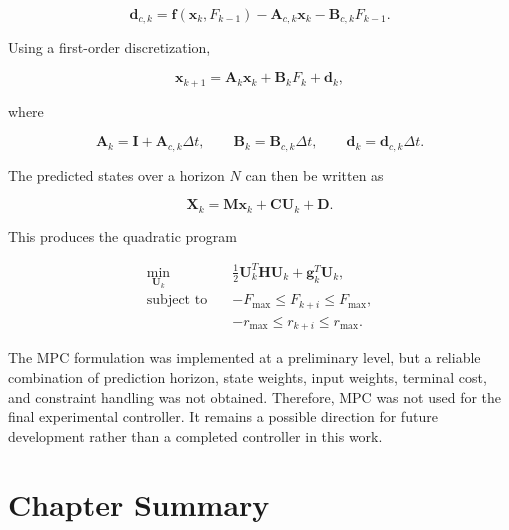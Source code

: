 \begin{equation}
\mathbf{d}_{c,k}
=
\mathbf{f}(\mathbf{x}_k,F_{k-1})
-
\mathbf{A}_{c,k}\mathbf{x}_k
-
\mathbf{B}_{c,k}F_{k-1}.
\end{equation}

Using a first-order discretization,

\begin{equation}
\mathbf{x}_{k+1}
=
\mathbf{A}_{k}\mathbf{x}_{k}
+
\mathbf{B}_{k}F_k
+
\mathbf{d}_{k},
\end{equation}

where

\begin{equation}
\mathbf{A}_{k}
=
\mathbf{I}
+
\mathbf{A}_{c,k}\Delta t,
\qquad
\mathbf{B}_{k}
=
\mathbf{B}_{c,k}\Delta t,
\qquad
\mathbf{d}_{k}
=
\mathbf{d}_{c,k}\Delta t.
\end{equation}

The predicted states over a horizon $N$ can then be written as

\begin{equation}
\mathbf{X}_k
=
\mathbf{M}\mathbf{x}_k
+
\mathbf{C}\mathbf{U}_k
+
\mathbf{D}.
\end{equation}

This produces the quadratic program

\begin{equation}
\begin{aligned}
\min_{\mathbf{U}_k}
\quad&
\frac{1}{2}
\mathbf{U}_k^{T}\mathbf{H}\mathbf{U}_k
+
\mathbf{g}_k^{T}\mathbf{U}_k,
\\
\text{subject to}
\quad&
-F_{\max}
\leq
F_{k+i}
\leq
F_{\max},
\\
&
-r_{\max}
\leq
r_{k+i}
\leq
r_{\max}.
\end{aligned}
\label{eq:mpc-optimization}
\end{equation}

The MPC formulation was implemented at a preliminary level, but a reliable combination of prediction horizon, state weights, input weights, terminal cost, and constraint handling was not obtained. Therefore, MPC was not used for the final experimental controller. It remains a possible direction for future development rather than a completed controller in this work.

\section{Chapter Summary}
\label{sec:controller-chapter-summary}

